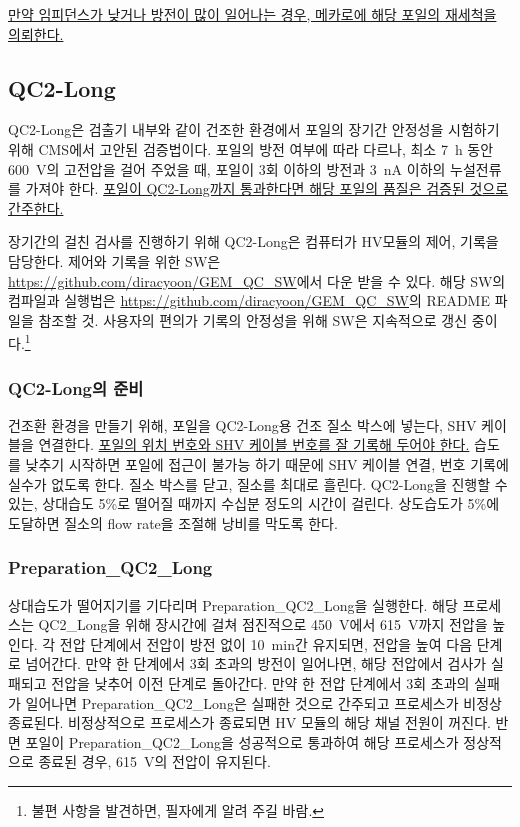 \uline{만약 임피던스가 낮거나 방전이 많이 일어나는 경우, 메카로에 해당 포일의 재세척을 의뢰한다.}


\subsection{QC2-Long}
QC2-Long은 검출기 내부와 같이 건조한 환경에서 포일의 장기간 안정성을 시험하기 위해 CMS에서 고안된 검증법이다. 포일의 방전 여부에 따라 다르나, 최소 \SI{7}{\hour} 동안 \SI{600}{\volt}의 고전압을 걸어 주었을 때, 포일이 3회 이하의 방전과 \SI{3}{\nano\ampere} 이하의 누설전류를 가져야 한다. \uline{포일이 QC2-Long까지 통과한다면 해당 포일의 품질은 검증된 것으로 간주한다.}

장기간의 걸친 검사를 진행하기 위해 QC2-Long은 컴퓨터가 HV모듈의 제어, 기록을 담당한다. 제어와 기록을 위한 SW은 \url{https://github.com/diracyoon/GEM_QC_SW}에서 다운 받을 수 있다. 해당 SW의 컴파일과 실행법은 \url{https://github.com/diracyoon/GEM_QC_SW}의 README 파일을 참조할 것. 사용자의 편의가 기록의 안정성을 위해 SW은 지속적으로 갱신 중이다.\footnote{불편 사항을 발견하면, 필자에게 알려 주길 바람.}

\subsubsection{QC2-Long의 준비}
건조환 환경을 만들기 위해, 포일을 QC2-Long용 건조 질소 박스에 넣는다, SHV 케이블을 연결한다. \uline{포일의 위치 번호와 SHV 케이블 번호를 잘 기록해 두어야 한다.} 습도를 낮추기 시작하면 포일에 접근이 불가능 하기 때문에 SHV 케이블 연결, 번호 기록에 실수가 없도록 한다. 질소 박스를 닫고, 질소를 최대로 흘린다. QC2-Long을 진행할 수 있는, 상대습도 5\%로 떨어질 때까지 수십분 정도의 시간이 걸린다. 상도습도가 5\%에 도달하면 질소의 flow rate을 조절해 낭비를 막도록 한다.

\subsubsection{Preparation\_QC2\_Long}
상대습도가 떨어지기를 기다리며 Preparation\_QC2\_Long을 실행한다. 해당 프로세스는 QC2\_Long을 위해 장시간에 걸쳐 점진적으로 \SI{450}{\volt}에서  \SI{615}{\volt}까지 전압을 높인다. 각 전압 단계에서 전압이 방전 없이  \SI{10}{\minute}간 유지되면, 전압을 높여 다음 단계로 넘어간다. 만약 한 단계에서 3회 초과의 방전이 일어나면, 해당 전압에서 검사가 실패되고 전압을 낮추어 이전 단계로 돌아간다. 만약 한 전압 단계에서 3회 초과의 실패가 일어나면 Preparation\_QC2\_Long은 실패한 것으로 간주되고 프로세스가 비정상 종료된다. 비정상적으로 프로세스가 종료되면 HV 모듈의 해당 채널 전원이 꺼진다. 반면 포일이 Preparation\_QC2\_Long을 성공적으로 통과하여 해당 프로세스가 정상적으로 종료된 경우, \SI{615}{\volt}의 전압이 유지된다.

